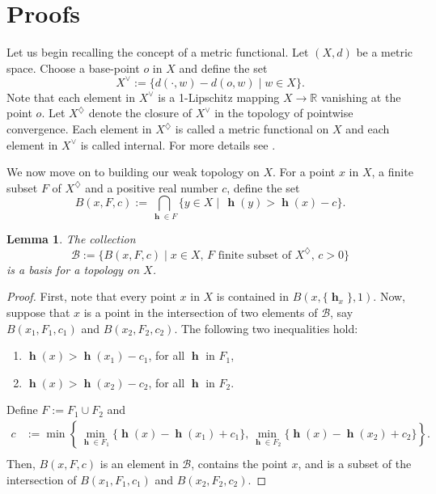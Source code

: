 \documentclass[11pt]{amsart}
\newtheorem{lemma}[theorem]{Lemma}
\theoremstyle{definition}
\numberwithin{equation}{section}
\DeclareMathOperator{\h}{\mathbf{h}} %
\newcommand{\R}{\mathbb{R}}  %
\numberwithin{equation}{section}
\begin{document}
\section{Proofs}\label{sec:proofs}

Let us begin recalling the concept of a metric functional. 
Let $(X,d)$ be a metric space. Choose a base-point $o$ 
in $X$ and define the set 
\begin{equation}
	X^{\vee} := \{ d(\cdot,w) - d(o,w) \mid w \in X\}.
\end{equation}
Note that each element in $X^{\vee}$ is a 1-Lipschitz mapping
$X\to \R$ vanishing at the point $o$. Let $X^{\diamondsuit}$ 
denote the closure of $X^{\vee}$ in the topology of pointwise
convergence. Each element in $X^{\diamondsuit}$ is called a 
metric functional on $X$ and each element in $X^{\vee}$ is 
called internal. For more details see \cite{GNweakconv}.

We now move on to building our weak topology on $X$. 
For a point $x$ in $X$, a finite subset $F$ 
of $X^\diamondsuit$ and a positive real number $c$, define 
the set
$$
    B(x,F,c):= \bigcap_{\h\in F}
    \{ y\in X \mid\, \h(y) > \h(x) - c\}.
$$

\begin{lemma}
The collection 
$$
\mathscr{B}:= \{ B(x,F,c) \mid x\in X,\, 
F \text{ finite subset of }X^\diamondsuit,\, c > 0\}
$$
is a basis for a topology on $X$.
\end{lemma}

\begin{proof}
First, note that every point $x$ in $X$ is contained in 
$B(x,\{\h_x\},1)$.
Now, suppose that $x$ is a point in the intersection
of two elements of $\mathscr{B}$, say $B(x_1,F_1,c_1)$ 
and $B(x_2,F_2,c_2)$. The following two inequalities hold:
\begin{enumerate}
    \item $\h(x) > \h(x_1) - c_1$, for all $\h$ in $F_1$,
    \item $\h(x) > \h(x_2) - c_2$, for all $\h$ in $F_2$.
\end{enumerate}
Define $F:=F_1 \cup F_2$ and
\begin{align*}
    c &:= \min\left\{\min_{\h\in F_1}\{\h(x)-\h(x_1)+c_1\}, 
    \min_{\h\in F_2}\{\h(x)-\h(x_2)+c_2\}\right\}. \\
\end{align*}
Then, $B(x,F,c)$ is an element in $\mathscr{B}$, contains
the point $x$, and is a subset of the intersection of 
$B(x_1,F_1,c_1)$ and $B(x_2,F_2,c_2)$.
\end{proof}
\end{document}
